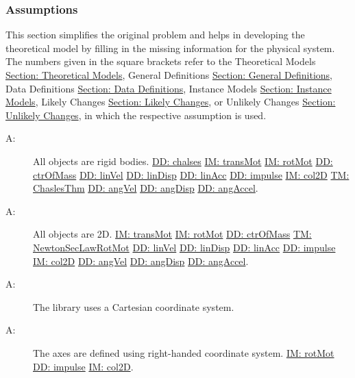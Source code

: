 \documentclass[12pt]{article}
\newcounter{assumpnum}
\newcommand{\atheassumpnum}{A\theassumpnum}
\begin{document}
\subsubsection{Assumptions}
\label{Sec:Assumps}
This section simplifies the original problem and helps in developing the theoretical model by filling in the missing information for the physical system. The numbers given in the square brackets refer to the Theoretical Models \hyperref[Sec:TMs]{Section: Theoretical Models}, General Definitions \hyperref[Sec:GDs]{Section: General Definitions}, Data Definitions \hyperref[Sec:DDs]{Section: Data Definitions}, Instance Models \hyperref[Sec:IMs]{Section: Instance Models}, Likely Changes \hyperref[Sec:LCs]{Section: Likely Changes}, or Unlikely Changes \hyperref[Sec:UCs]{Section: Unlikely Changes}, in which the respective assumption is used.
\begin{description}
\item[\atheassumpnum\label{A:objectTy}:]All objects are rigid bodies. \hyperref[DD:chalses]{DD: chalses} \hyperref[IM:transMot]{IM: transMot} \hyperref[IM:rotMot]{IM: rotMot} \hyperref[DD:ctrOfMass]{DD: ctrOfMass} \hyperref[DD:linVel]{DD: linVel} \hyperref[DD:linDisp]{DD: linDisp} \hyperref[DD:linAcc]{DD: linAcc} \hyperref[DD:impulse]{DD: impulse} \hyperref[IM:col2D]{IM: col2D} \hyperref[TM:ChaslesThm]{TM: ChaslesThm} \hyperref[DD:angVel]{DD: angVel} \hyperref[DD:angDisp]{DD: angDisp} \hyperref[DD:angAccel]{DD: angAccel}.
\end{description}
\begin{description}
\item[\atheassumpnum\label{A:objectDimension}:]All objects are 2D. \hyperref[IM:transMot]{IM: transMot} \hyperref[IM:rotMot]{IM: rotMot} \hyperref[DD:ctrOfMass]{DD: ctrOfMass} \hyperref[TM:NewtonSecLawRotMot]{TM: NewtonSecLawRotMot} \hyperref[DD:linVel]{DD: linVel} \hyperref[DD:linDisp]{DD: linDisp} \hyperref[DD:linAcc]{DD: linAcc} \hyperref[DD:impulse]{DD: impulse} \hyperref[IM:col2D]{IM: col2D} \hyperref[DD:angVel]{DD: angVel} \hyperref[DD:angDisp]{DD: angDisp} \hyperref[DD:angAccel]{DD: angAccel}.
\end{description}
\begin{description}
\item[\atheassumpnum\label{A:coordinateSystemTy}:]The library uses a Cartesian coordinate system.
\end{description}
\begin{description}
\item[\atheassumpnum\label{A:axesDefined}:]The axes are defined using right-handed coordinate system. \hyperref[IM:rotMot]{IM: rotMot} \hyperref[DD:impulse]{DD: impulse} \hyperref[IM:col2D]{IM: col2D}.
\end{description}
\end{document}
